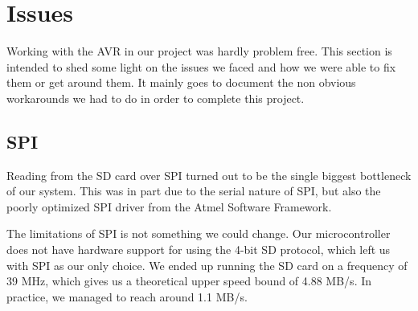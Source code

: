 \section{Issues}

Working with the AVR in our project was hardly problem free. This section is intended to shed some light on the issues we faced and how we were able to fix them or get around them. It mainly goes to document the non obvious workarounds we had to do in order to complete this project.

\subsection{SPI}
\label{sec:avr-spi-issues}
Reading from the \ac{SD} card over \ac{SPI} turned out to be the single biggest
bottleneck of our system. This was in part due to the serial nature of \ac{SPI},
but also the poorly optimized \ac{SPI} driver from the Atmel Software Framework.

The limitations of \ac{SPI} is not something we could change. Our
microcontroller does not have hardware support for using the 4-bit \ac{SD}
protocol, which left us with \ac{SPI} as our only choice. We ended up running
the \ac{SD} card on a frequency of 39 MHz, which gives us a theoretical upper
speed bound of 4.88 MB/s. In practice, we managed to reach around 1.1 MB/s.

